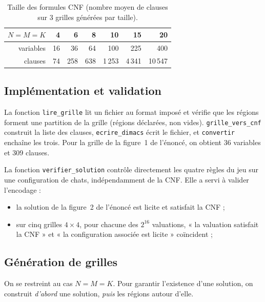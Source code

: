 \documentclass[11pt,a4paper]{article}
\begin{document}
\begin{table}[h]
  \centering
  \begin{tabular}{rrrrrrr}
    \toprule
    $N=M=K$   & 4 & 6 & 8 & 10 & 15 & 20\\
    \midrule
    variables & 16 & 36 & 64 & 100 & 225 & 400\\
    clauses   & 74 & 258 & 638 & 1\,253 & 4\,341 & 10\,547\\
    \bottomrule
  \end{tabular}
  \caption{Taille des formules CNF (nombre moyen de clauses sur 3 grilles générées par taille).}
  \label{tab:tailles}
\end{table}

\subsection{Implémentation et validation}

La fonction \texttt{lire\_grille} lit un fichier au format imposé et vérifie que les régions
forment une partition de la grille (régions déclarées, non vides). \texttt{grille\_vers\_cnf}
construit la liste des clauses, \texttt{ecrire\_dimacs} écrit le fichier, et \texttt{convertir}
enchaîne les trois. Pour la grille de la figure~1 de l'énoncé,
on obtient 36 variables et 309 clauses.

La fonction \texttt{verifier\_solution} contrôle directement les quatre règles du jeu sur une
configuration de chats, indépendamment de la CNF. Elle a servi à valider l'encodage :
\begin{itemize}
  \item la solution de la figure~2 de l'énoncé est licite et satisfait la CNF ;
  \item sur cinq grilles $4\times4$, pour chacune des $2^{16}$ valuations, « la valuation satisfait
        la CNF » et « la configuration associée est licite » coïncident ;
\end{itemize}

\subsection{Génération de grilles}\label{sec:generation}

On se restreint au cas $N=M=K$. Pour garantir l'existence d'une solution, on construit
\emph{d'abord} une solution, \emph{puis} les régions autour d'elle.
\end{document}
